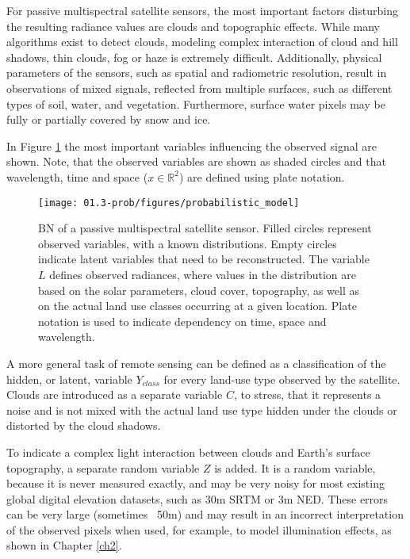 For passive multispectral satellite sensors, the most important factors disturbing the resulting radiance values are clouds and topographic effects. While many algorithms exist to detect clouds, modeling complex interaction of cloud and hill shadows, thin clouds, fog or haze is extremely difficult. Additionally, physical parameters of the sensors, such as spatial and radiometric resolution, result in observations of mixed signals, reflected from multiple surfaces, such as different types of soil, water, and vegetation. Furthermore, surface water pixels may be fully or partially covered by snow and ice.

In Figure \ref{fig:pgm} the most important variables influencing the observed signal are shown. Note, that the observed variables are shown as shaded circles and that wavelength, time and space ($x \in \mathbb{R}^2$) are defined using plate notation.

\begin{figure}
	\centering
	\texttt{[image: 01.3-prob/figures/probabilistic\_model]} 
	\caption{\gls{BN} of a passive multispectral satellite sensor. Filled circles represent observed variables, with a known distributions. Empty circles indicate latent variables that need to be reconstructed. The variable $L$ defines observed radiances, where values in the distribution are based on the solar parameters, cloud cover, topography, as well as on the actual land use classes occurring at a given location. Plate notation is used to indicate dependency on time, space and wavelength.}
	\label{fig:pgm}
\end{figure}

A more general task of remote sensing can be defined as a classification of the hidden, or latent, variable $Y_{class}$ for every land-use type observed by the satellite. Clouds are introduced as a separate variable $C$, to stress, that it represents a noise and is not mixed with the actual land use type hidden under the clouds or distorted by the cloud shadows. 

To indicate a complex light interaction between clouds and Earth's surface topography, a separate random variable $Z$ is added. It is a random variable, because it is never measured exactly, and may be very noisy for most existing global digital elevation datasets, such as 30m \gls{SRTM} or 3m \gls{NED}. These errors can be very large (sometimes ~50m) and may result in an incorrect interpretation of the observed pixels when used, for example, to model illumination effects, as shown in Chapter \ref{ch2}.

